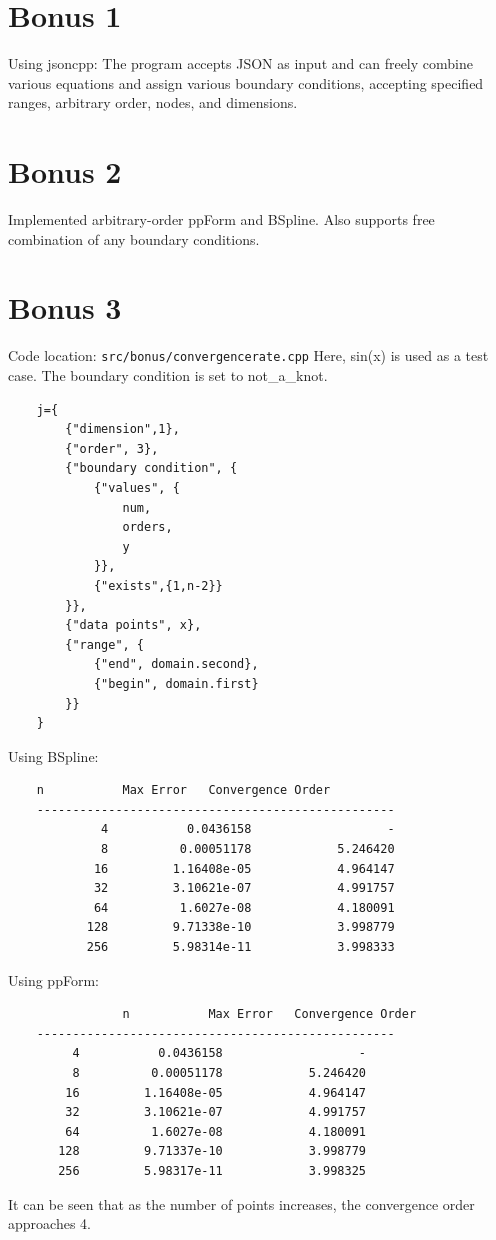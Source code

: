 \documentclass[a4paper]{article}
\begin{document}
\section*{Bonus 1}
Using jsoncpp:
The program accepts JSON as input and can freely combine various equations and assign various boundary conditions, accepting specified ranges, arbitrary order, nodes, and dimensions.

\section*{Bonus 2}
Implemented arbitrary-order ppForm and BSpline.
Also supports free combination of any boundary conditions.

\section*{Bonus 3}
Code location: \texttt{src/bonus/convergencerate.cpp}
Here, sin(x) is used as a test case.
The boundary condition is set to not\_a\_knot.
\begin{verbatim}
    j={
        {"dimension",1},
        {"order", 3},
        {"boundary condition", {
            {"values", {
                num,
                orders,
                y
            }},
            {"exists",{1,n-2}}
        }},
        {"data points", x},
        {"range", {
            {"end", domain.second},
            {"begin", domain.first}
        }}
    }
\end{verbatim}
Using BSpline:
\begin{verbatim}
    n           Max Error   Convergence Order
    --------------------------------------------------
             4           0.0436158                   -
             8          0.00051178            5.246420
            16         1.16408e-05            4.964147
            32         3.10621e-07            4.991757
            64          1.6027e-08            4.180091
           128         9.71338e-10            3.998779
           256         5.98314e-11            3.998333
\end{verbatim}
Using ppForm:
\begin{verbatim}
                n           Max Error   Convergence Order
    --------------------------------------------------
         4           0.0436158                   -
         8          0.00051178            5.246420
        16         1.16408e-05            4.964147
        32         3.10621e-07            4.991757
        64          1.6027e-08            4.180091
       128         9.71337e-10            3.998779
       256         5.98317e-11            3.998325
\end{verbatim}
It can be seen that as the number of points increases, the convergence order approaches 4.
\end{document}
